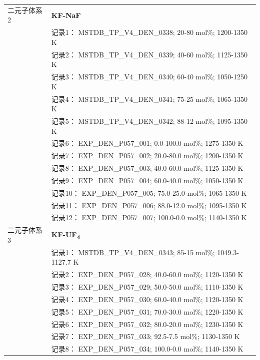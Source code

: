 \documentclass[12pt]{article}
\begin{document}
{\begin{longtable}[]{@{}
  >{\raggedright\arraybackslash}p{}
  >{\raggedright\arraybackslash}p{}@{}}
二元子体系 2  & \textbf{KF-NaF} \\
 & 记录1： MSTDB\_TP\_V4\_DEN\_0338; 20-80 mol\%; 1200-1350 K \\
 & 记录2： MSTDB\_TP\_V4\_DEN\_0339; 40-60 mol\%; 1125-1350 K \\
 & 记录3： MSTDB\_TP\_V4\_DEN\_0340; 60-40 mol\%; 1050-1250 K \\
 & 记录4： MSTDB\_TP\_V4\_DEN\_0341; 75-25 mol\%; 1065-1350 K \\
 & 记录5： MSTDB\_TP\_V4\_DEN\_0342; 88-12 mol\%; 1095-1350 K \\
 & 记录6： EXP\_DEN\_P057\_001; 0.0-100.0 mol\%; 1275-1350 K \\
 & 记录7： EXP\_DEN\_P057\_002; 20.0-80.0 mol\%; 1200-1350 K \\
 & 记录8： EXP\_DEN\_P057\_003; 40.0-60.0 mol\%; 1125-1350 K \\
 & 记录9： EXP\_DEN\_P057\_004; 60.0-40.0 mol\%; 1050-1350 K \\
 & 记录10： EXP\_DEN\_P057\_005; 75.0-25.0 mol\%; 1065-1350 K \\
 & 记录11： EXP\_DEN\_P057\_006; 88.0-12.0 mol\%; 1095-1350 K \\
 & 记录12： EXP\_DEN\_P057\_007; 100.0-0.0 mol\%; 1140-1350 K  \\

二元子体系 3  & \textbf{KF-UF\textsubscript{4}} \\
 & 记录1： MSTDB\_TP\_V4\_DEN\_0343; 85-15 mol\%; 1049.3-1127.7 K \\
 & 记录2： EXP\_DEN\_P057\_028; 40.0-60.0 mol\%; 1120-1350 K \\
 & 记录3： EXP\_DEN\_P057\_029; 50.0-50.0 mol\%; 1110-1350 K \\
 & 记录4： EXP\_DEN\_P057\_030; 60.0-40.0 mol\%; 1120-1350 K \\
 & 记录5： EXP\_DEN\_P057\_031; 70.0-30.0 mol\%; 1220-1350 K \\
 & 记录6： EXP\_DEN\_P057\_032; 80.0-20.0 mol\%; 1230-1350 K \\
 & 记录7： EXP\_DEN\_P057\_033; 92.5-7.5 mol\%; 1130-1350 K \\
 & 记录8： EXP\_DEN\_P057\_034; 100.0-0.0 mol\%; 1140-1350 K  \\


\end{longtable}}
\end{document}
